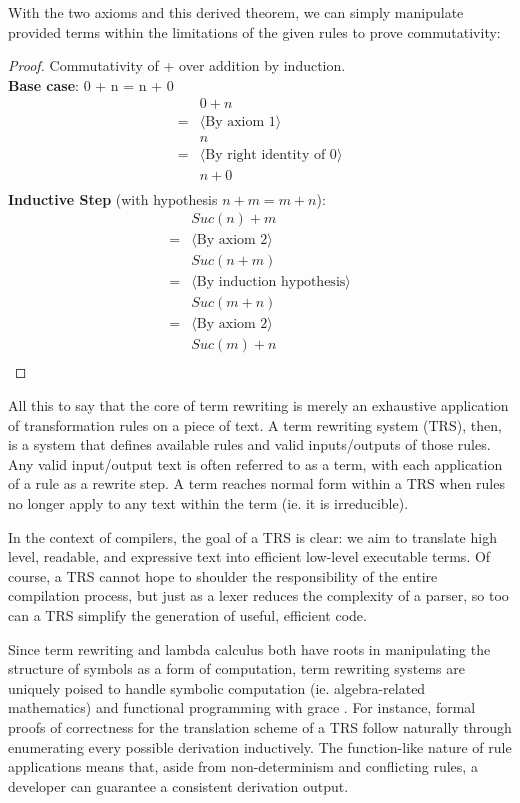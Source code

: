\documentclass{article}
\begin{document}
With the two axioms and this derived theorem, we can simply manipulate provided terms within the limitations of the given rules to prove commutativity:
\begin{proof}
    Commutativity of + over addition by induction.
    \\
    \textbf{Base case}: 0 + n = n + 0
\begin{align*}
    &0 + n\\
    = &\langle \text{By axiom 1} \rangle \\
    &n\\
    = &\langle \text{By right identity of 0} \rangle \\
    &n + 0\\
\end{align*}
\textbf{Inductive Step} (with hypothesis $n + m = m + n$):
\begin{align*}
    &Suc(n) + m\\
    = &\langle \text{By axiom 2} \rangle \\
    &Suc(n+m)\\
    = &\langle \text{By induction hypothesis} \rangle \\
    &Suc(m+n)\\
    = &\langle \text{By axiom 2} \rangle \\
    &Suc(m)+n\\
\end{align*}
\end{proof}

All this to say that the core of term rewriting is merely an exhaustive application of transformation rules on a piece of text.
A term rewriting system (TRS), then, is a system that defines available rules and valid inputs/outputs of those rules.
Any valid input/output text is often referred to as a term, with each application of a rule as a rewrite step.
A term reaches normal form within a TRS when rules no longer apply to any text within the term (ie. it is irreducible).

In the context of compilers, the goal of a TRS is clear: we aim to translate high level,
readable, and expressive text into efficient low-level executable terms. Of course,
a TRS cannot hope to shoulder the responsibility of the entire compilation process,
but just as a lexer reduces the complexity of a parser, so too can a TRS simplify the generation of useful, efficient code.

Since term rewriting and lambda calculus both have roots in manipulating the structure of symbols as a form of computation,
term rewriting systems are uniquely poised to handle symbolic computation (ie. algebra-related mathematics) and functional programming with grace \cite{baader1998term}.
For instance, formal proofs of correctness for the translation scheme of a TRS follow naturally through enumerating every possible derivation inductively.
The function-like nature of rule applications means that, aside from non-determinism and conflicting rules,
a developer can guarantee a consistent derivation output.
\end{document}
